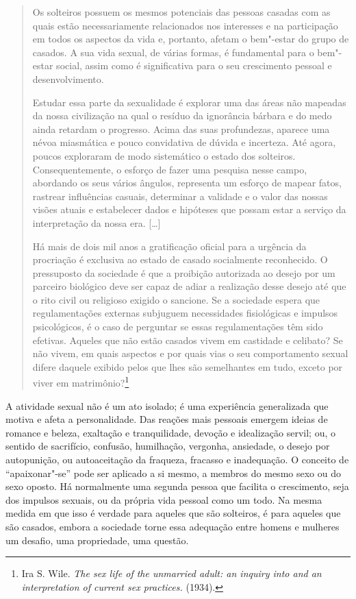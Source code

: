\begin{quote}
Os solteiros possuem os mesmos potenciais das pessoas casadas com as
quais estão necessariamente relacionados nos interesses e na
participação em todos os aspectos da vida e, portanto, afetam o
bem"-estar do grupo de casados. A sua vida sexual, de várias formas, é
fundamental para o bem"-estar social, assim como é significativa para o
seu crescimento pessoal e desenvolvimento.

Estudar essa parte da sexualidade é explorar uma das áreas não
mapeadas da nossa civilização na qual o resíduo da ignorância bárbara e
do medo ainda retardam o progresso. Acima das suas profundezas, aparece
uma névoa miasmática e pouco convidativa de dúvida e incerteza. Até
agora, poucos exploraram de modo sistemático o estado dos solteiros.
Consequentemente, o esforço de fazer uma pesquisa nesse campo, abordando
os seus vários ângulos, representa um esforço de mapear fatos, rastrear
influências casuais, determinar a validade e o valor das nossas visões
atuais e estabelecer dados e hipóteses que possam estar a serviço
da interpretação da nossa era. {[}\ldots{}{]}

Há mais de dois mil anos a gratificação oficial para a urgência da procriação
é exclusiva ao estado de casado socialmente reconhecido. O
pressuposto da sociedade é que a proibição autorizada ao desejo por um
parceiro biológico deve ser capaz de adiar a realização desse desejo até que o
rito civil ou religioso exigido o sancione. Se a sociedade espera
que regulamentações externas subjuguem necessidades fisiológicas e
impulsos psicológicos, é o caso de perguntar se essas regulamentações têm
sido efetivas. Aqueles que não estão casados vivem em castidade e
celibato? Se não vivem, em quais aspectos e por quais vias o seu comportamento sexual
difere daquele exibido pelos que lhes são semelhantes em tudo,
exceto por viver em matrimônio?\footnote{Ira S. Wile. \emph{The sex
  life of the unmarried adult: an inquiry into and an interpretation of
  current sex practices.} (1934).}
  \end{quote}

A atividade sexual não é um ato isolado; é uma experiência generalizada
que motiva e afeta a personalidade. Das reações mais pessoais
emergem ideias de romance e beleza, exaltação e tranquilidade, devoção e
idealização servil; ou, o sentido de sacrifício, confusão, humilhação,
vergonha, ansiedade, o desejo por autopunição, ou autoaceitação da
fraqueza, fracasso e inadequação. O conceito de ``apaixonar"-se'' pode
ser aplicado a si mesmo, a membros do mesmo sexo ou do sexo oposto. Há
normalmente uma segunda pessoa que facilita o crescimento, seja dos
impulsos sexuais, ou da própria vida pessoal como um todo. Na mesma
medida em que isso é verdade para aqueles que são solteiros, é para
aqueles que são casados, embora a sociedade torne essa adequação entre homens e mulheres um
desafio, uma propriedade, uma questão.

